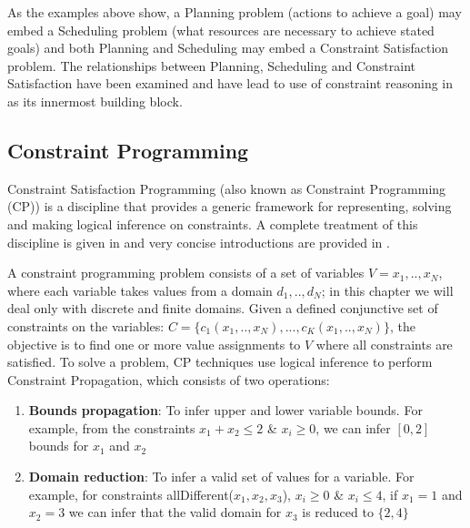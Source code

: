 As the examples above show, a Planning problem (actions to achieve a
goal) may embed a Scheduling problem (what resources are necessary to
achieve stated goals) and both Planning and Scheduling may embed a
Constraint Satisfaction problem. %
The relationships between Planning, Scheduling and Constraint
Satisfaction have been examined \cite{smith00} and have lead to use of
constraint reasoning in \eu as its innermost building block. 

\subsection{Constraint Programming}
\label{sec:europa:cp}

Constraint Satisfaction Programming (also known as Constraint
Programming (CP)) is a discipline that provides a generic framework
for representing, solving and making logical inference on
constraints. A complete treatment of this discipline is given in
\cite{marriott98,apt03} and very concise introductions are provided in
\cite{bartak99,lustig01}.

A constraint programming problem consists of a set of variables $V=
{x_1,..,x_N}$, where each variable takes values from a domain
$d_1,..,d_N$; in this chapter we will deal only with discrete and
finite domains. Given a defined conjunctive set of constraints on the
variables: $C=\{c_1(x_1,..,x_N), ..., c_K(x_1,..,x_N)\}$, the
objective is to find one or more value assignments to $V$ where all
constraints are satisfied. To solve a problem, CP techniques use
logical inference to perform Constraint Propagation, which consists of
two operations:

\begin{enumerate}

\item \textbf{Bounds propagation}: To infer upper and lower variable
  bounds. For example, from the constraints $x_1 + x_2 \leq 2$ \&
  $x_i \geq 0$, we can infer $[0,2]$ bounds for $x_1$ and $x_2$

\item \textbf{Domain reduction}: To infer a valid set of values for a variable.
  For example, for  constraints allDifferent($x_1,x_2,x_3$), $x_i \geq
  0$ \& $x_i \leq 4$, if $x_1 = 1$ and $x_2 = 3$ we can infer that the
  valid domain for $x_3$ is reduced  to $\{2,4\}$

\end{enumerate}

